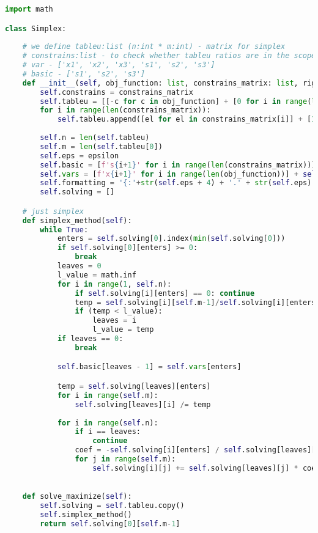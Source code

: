 \documentclass[12pt, legalpaper]{exam}
\begin{document}
\begin{lstlisting}[language=Python, caption=Программа на Python, label=lst:python-code]
import math

class Simplex:
    
    # we define tableu:list (n:int * m:int) - matrix for simplex
    # constrains:list - to check whether tableu ratios are in the scope of them
    # var - ['x1', 'x2', 'x3', 's1', 's2', 's3']
    # basic - ['s1', 's2', 's3']
    def __init__(self, obj_function: list, constrains_matrix: list, right_hand_side_num: list, epsilon:int):
        self.constrains = constrains_matrix
        self.tableu = [[-c for c in obj_function] + [0 for i in range(len(constrains_matrix))] + [0]]
        for i in range(len(constrains_matrix)):
            self.tableu.append([el for el in constrains_matrix[i]] + [1 if i == j else 0 for j in range(len(constrains_matrix))] + [right_hand_side_num[i]])
        
        self.n = len(self.tableu)
        self.m = len(self.tableu[0])
        self.eps = epsilon
        self.basic = [f's{i+1}' for i in range(len(constrains_matrix))]
        self.vars = [f'x{i+1}' for i in range(len(obj_function))] + self.basic
        self.formatting = '{:'+str(self.eps + 4) + '.' + str(self.eps) + 'f}'
        self.solving = []

    # just simplex 
    def simplex_method(self):
        while True:
            enters = self.solving[0].index(min(self.solving[0]))
            if self.solving[0][enters] >= 0:
                break
            leaves = 0
            l_value = math.inf
            for i in range(1, self.n):
                if self.solving[i][enters] == 0: continue
                temp = self.solving[i][self.m-1]/self.solving[i][enters]
                if (temp < l_value):
                    leaves = i
                    l_value = temp
            if leaves == 0:
                break

            self.basic[leaves - 1] = self.vars[enters]

            temp = self.solving[leaves][enters]
            for i in range(self.m):
                self.solving[leaves][i] /= temp
        
            for i in range(self.n):
                if i == leaves:
                    continue
                coef = -self.solving[i][enters] / self.solving[leaves][enters]
                for j in range(self.m):
                    self.solving[i][j] += self.solving[leaves][j] * coef

    
    def solve_maximize(self):
        self.solving = self.tableu.copy()
        self.simplex_method()
        return self.solving[0][self.m-1]
        

\end{lstlisting}
\end{document}
